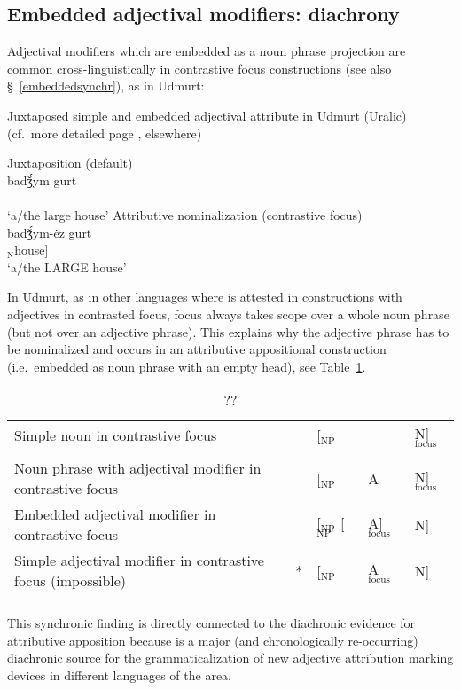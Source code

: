 \subsection{Embedded adjectival modifiers: diachrony}\label{embeddeddiachr}
Adjectival modifiers which are embedded as a noun phrase projection are common cross-linguistically in contrastive focus constructions (see also \S~\ref{embeddedsynchr}), as in Udmurt:
\begin{exe}
\ex \rm{Juxtaposed simple and embedded adjectival attribute in Udmurt (Uralic)}\\(cf.~more detailed page \pageref{udmurt synchr}, elsewhere)
\begin{xlist}
\ex	\rm{Juxtaposition (default)}\\
\gll	{}		badǯ́ym gurt\\
	[$_{\text{NP}}$ $_{\text{A}}$big $_{\text{N}}$house]\\
\glt	‘a/the large house’
\ex	\rm{Attributive nominalization (contrastive focus)}\\
\gll	{}		{}			badǯ́ym-ėz gurt\\
	[$_{\text{NP}}$ [$_{\text{NP'}}$ $_{\text{A}}$big-\textsc{nmlz}] $_{\text{N}}$house]\\
\glt	‘a/the LARGE house’
\end{xlist}
\end{exe}
In Udmurt, as in other languages where  is attested in constructions with adjectives in contrasted focus, focus always takes scope over a whole noun phrase (but not over an adjective phrase). This explains why the adjective phrase has to be nominalized and occurs in an attributive appositional construction (i.e.~embedded as noun phrase with an empty head), see Table~\ref{udm-nom}.
\begin{table}
\begin{tabularx}{\textwidth}{X r l l l}
\lsptoprule
Simple noun in contrastive focus					&	&[$_{\text{NP}}$ 		&			&N]$_{\text{focus}}$\\
\\
\midrule
Noun phrase with adjectival modifier in contrastive focus	&	&[$_{\text{NP}}$ 		&A 			&N]$_{\text{focus}}$\\
\midrule
Embedded adjectival modifier in contrastive focus		&	&[$_{\text{NP}}$ [$_{\text{NP'}}$ &A]$_{\text{focus}}$ 	&N]\\
\midrule
Simple adjectival modifier in contrastive focus (impossible)&{*}	&[$_{\text{NP}}$ 		&A$_{\text{focus}}$ 	&N]\\
\lspbottomrule
\end{tabularx}
\caption[??]{??}\label{udm-nom}
\end{table}
This synchronic finding is directly connected to the diachronic evidence for attributive apposition because  is a major (and chronologically re-occurring) diachronic source for the grammaticalization of new adjective attribution marking devices in different languages of the area.

